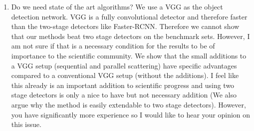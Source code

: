 \documentclass[a4paper,12pt]{scrartcl}
\begin{document}
\begin{enumerate}
	\item Do we need state of the art algorithms? We use a VGG as the object detection network. VGG is a fully convolutional detector and therefore faster than the two-stage detectors like Faster-RCNN. Therefore we cannot show that our methods beat two stage detectors on the benchmark sets. However, I am not sure if that is a necessary condition for the results to be of importance to the scientific community. We show that the small additions to a VGG setup (sequential and parallel scattering) have specific advantages compared to a conventional VGG setup (without the additions). I feel like this already is an important addition to scientific progress and using two stage detectors is only a nice to have but not necessary addition (We also argue why the method is easily extendable to two stage detectors).
	However, you have significantly more experience so I would like to hear your opinion on this issue.  
\end{enumerate}
	
	
	
	


	
	
	
	
	
	
	
	
	
	
	
	
	
	
	
	
	
\end{document}
